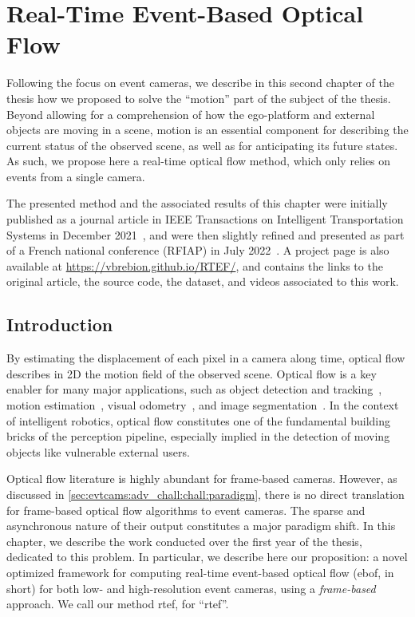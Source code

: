 \chapter{Real-Time Event-Based Optical Flow}\label{sec:ebof}

Following the focus on event cameras, we describe in this second chapter of the thesis how we proposed to solve the ``motion'' part of the subject of the thesis. Beyond allowing for a comprehension of how the ego-platform and external objects are moving in a scene, motion is an essential component for describing the current status of the observed scene, as well as for anticipating its future states. As such, we propose here a real-time optical flow method, which only relies on events from a single camera.

The presented method and the associated results of this chapter were initially published as a journal article in IEEE Transactions on Intelligent Transportation Systems in December 2021~\cite{Brebion2022RealTimeOF}, and were then slightly refined and presented as part of a French national conference (RFIAP) in July 2022~\cite{Brebion2022EstimationDF}. A project page is also available at \url{https://vbrebion.github.io/RTEF/}, and contains the links to the original article, the source code, the dataset, and videos associated to this work.


\section{Introduction}
By estimating the displacement of each pixel in a camera along time, optical flow describes in 2D the motion field of the observed scene. Optical flow is a key enabler for many major applications, such as object detection and tracking~\cite{Braillon2006RealtimeMO}, motion estimation~\cite{Hossen2016ASS}, visual odometry~\cite{Chuanqi2017MonocularVO}, and image segmentation~\cite{Galic2000SpatiotemporalIS}. In the context of intelligent robotics, optical flow constitutes one of the fundamental building bricks of the perception pipeline, especially implied in the detection of moving objects like vulnerable external users.

Optical flow literature is highly abundant for frame-based cameras. However, as discussed in \cref{sec:evtcams:adv_chall:chall:paradigm}, there is no direct translation for frame-based optical flow algorithms to event cameras. The sparse and asynchronous nature of their output constitutes a major paradigm shift. In this chapter, we describe the work conducted over the first year of the thesis, dedicated to this problem. In particular, we describe here our proposition: a novel optimized framework for computing real-time event-based optical flow (\acrshort{ebof}, in short) for both low- and high-resolution event cameras, using a \textit{frame-based} approach. We call our method \acrshort{rtef}, for ``\acrlong{rtef}''.

